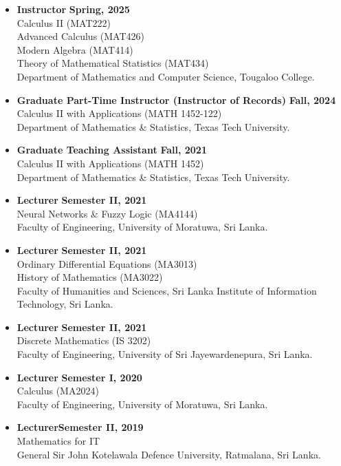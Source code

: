 \documentclass[12pt]{book}
\begin{document}
\begin{itemize}
\item \textbf{Instructor} \hfill \textbf{Spring, 2025}\\
Calculus II (MAT222)\\
Advanced Calculus (MAT426)\\
Modern Algebra (MAT414)\\
Theory of Mathematical Statistics (MAT434)\\
Department of Mathematics and Computer Science, Tougaloo College.
	\item \textbf{Graduate Part-Time Instructor (Instructor of Records)} \hfill \textbf{Fall, 2024}\\
Calculus II with Applications (MATH 1452-122)\\
Department of Mathematics \& Statistics, Texas Tech University.
\item \textbf{Graduate Teaching Assistant} \hfill \textbf{Fall, 2021}\\
Calculus II with Applications (MATH 1452)\\
Department of Mathematics \& Statistics, Texas Tech University.
\item \textbf{Lecturer } \hfill \textbf{Semester II, 2021}\\
Neural Networks \& Fuzzy Logic (MA4144)\\
Faculty of Engineering, University of Moratuwa, Sri Lanka.
\item  \textbf{Lecturer} \hfill \textbf{Semester II, 2021}\\
Ordinary Differential Equations (MA3013)\\
History of Mathematics (MA3022)\\
Faculty of Humanities and Sciences, Sri Lanka Institute of Information Technology, Sri Lanka.

\item \textbf{Lecturer} \hfill \textbf{Semester II, 2021}\\
Discrete Mathematics (IS 3202)\\
Faculty of Engineering, University of Sri Jayewardenepura, Sri Lanka.

\item  \textbf{Lecturer }\hfill\textbf{ Semester I, 2020}\\
Calculus (MA2024)\\
Faculty of Engineering, University of Moratuwa, Sri Lanka. 

\item  \textbf{Lecturer}\hfill  \textbf{Semester II, 2019}\\
Mathematics for IT\\
General Sir John Kotelawala Defence University, Ratmalana, Sri Lanka.


\end{itemize}
\end{document}
